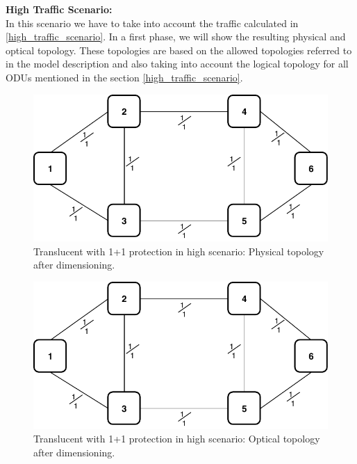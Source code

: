 \clearpage
\textbf{High Traffic Scenario:}\\

In this scenario we have to take into account the traffic calculated in \ref{high_traffic_scenario}. In a first phase, we will show the resulting physical and optical topology. These topologies are based on the allowed topologies referred to in the model description and also taking into account the logical topology for all ODUs mentioned in the section \ref{high_traffic_scenario}. \\

\begin{figure}[h!]
\centering
\includegraphics[width=12cm]{sdf/ilp/translucent_protection/figures/physical_topology}
\caption{Translucent with 1+1 protection in high scenario: Physical topology after dimensioning.}
\label{physical3_protectionhigh}
\end{figure}

\begin{figure}[h!]
\centering
\includegraphics[width=12cm]{sdf/ilp/translucent_protection/figures/physical_topology}
\caption{Translucent with 1+1 protection in high scenario: Optical topology after dimensioning.}
\label{optical3_protectionhigh}
\end{figure}

